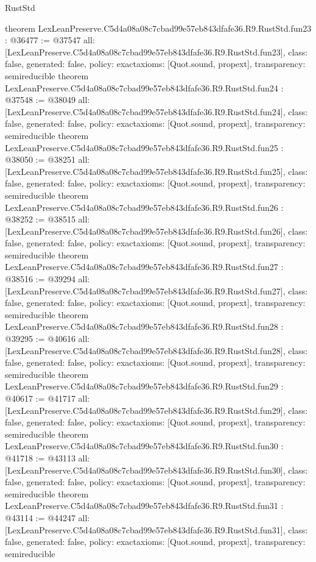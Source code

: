 \begin{lexlean}{RustStd}
\begin{coremodule}
{}
theorem LexLeanPreserve.C5d4a08a08c7cbad99e57eb843dfafe36.R9.RustStd.fun23 : @36477 := @37547 {
  all: [LexLeanPreserve.C5d4a08a08c7cbad99e57eb843dfafe36.R9.RustStd.fun23],
  class: false,
  generated: false,
  policy: exact{axioms: [Quot.sound, propext]},
  transparency: semireducible
}
theorem LexLeanPreserve.C5d4a08a08c7cbad99e57eb843dfafe36.R9.RustStd.fun24 : @37548 := @38049 {
  all: [LexLeanPreserve.C5d4a08a08c7cbad99e57eb843dfafe36.R9.RustStd.fun24],
  class: false,
  generated: false,
  policy: exact{axioms: [Quot.sound, propext]},
  transparency: semireducible
}
theorem LexLeanPreserve.C5d4a08a08c7cbad99e57eb843dfafe36.R9.RustStd.fun25 : @38050 := @38251 {
  all: [LexLeanPreserve.C5d4a08a08c7cbad99e57eb843dfafe36.R9.RustStd.fun25],
  class: false,
  generated: false,
  policy: exact{axioms: [Quot.sound, propext]},
  transparency: semireducible
}
theorem LexLeanPreserve.C5d4a08a08c7cbad99e57eb843dfafe36.R9.RustStd.fun26 : @38252 := @38515 {
  all: [LexLeanPreserve.C5d4a08a08c7cbad99e57eb843dfafe36.R9.RustStd.fun26],
  class: false,
  generated: false,
  policy: exact{axioms: [Quot.sound, propext]},
  transparency: semireducible
}
theorem LexLeanPreserve.C5d4a08a08c7cbad99e57eb843dfafe36.R9.RustStd.fun27 : @38516 := @39294 {
  all: [LexLeanPreserve.C5d4a08a08c7cbad99e57eb843dfafe36.R9.RustStd.fun27],
  class: false,
  generated: false,
  policy: exact{axioms: [Quot.sound, propext]},
  transparency: semireducible
}
theorem LexLeanPreserve.C5d4a08a08c7cbad99e57eb843dfafe36.R9.RustStd.fun28 : @39295 := @40616 {
  all: [LexLeanPreserve.C5d4a08a08c7cbad99e57eb843dfafe36.R9.RustStd.fun28],
  class: false,
  generated: false,
  policy: exact{axioms: [Quot.sound, propext]},
  transparency: semireducible
}
theorem LexLeanPreserve.C5d4a08a08c7cbad99e57eb843dfafe36.R9.RustStd.fun29 : @40617 := @41717 {
  all: [LexLeanPreserve.C5d4a08a08c7cbad99e57eb843dfafe36.R9.RustStd.fun29],
  class: false,
  generated: false,
  policy: exact{axioms: [Quot.sound, propext]},
  transparency: semireducible
}
theorem LexLeanPreserve.C5d4a08a08c7cbad99e57eb843dfafe36.R9.RustStd.fun30 : @41718 := @43113 {
  all: [LexLeanPreserve.C5d4a08a08c7cbad99e57eb843dfafe36.R9.RustStd.fun30],
  class: false,
  generated: false,
  policy: exact{axioms: [Quot.sound, propext]},
  transparency: semireducible
}
theorem LexLeanPreserve.C5d4a08a08c7cbad99e57eb843dfafe36.R9.RustStd.fun31 : @43114 := @44247 {
  all: [LexLeanPreserve.C5d4a08a08c7cbad99e57eb843dfafe36.R9.RustStd.fun31],
  class: false,
  generated: false,
  policy: exact{axioms: [Quot.sound, propext]},
  transparency: semireducible
}
\end{coremodule}
\end{lexlean}
